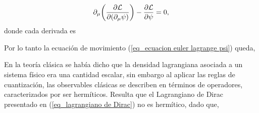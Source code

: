 \begin{equation}
	\partial_\mu \qty( \pdv{\mathcal{L}}{\qty( \partial_\mu \psi )} ) - \pdv{\mathcal{L}}{\psi} = 0,
	\label{eq_ecuacion euler lagrange psi}
\end{equation}
donde cada derivada es

Por lo tanto la ecuación de movimiento (\ref{eq_ecuacion euler lagrange psi}) queda,


En la teoría clásica se había dicho que la densidad lagrangiana asociada a un sistema físico era una cantidad escalar, sin embargo al aplicar las reglas de cuantización, las observables clásicas se describen en términos de operadores, caracterizados por ser hermíticos. Resulta que el Lagrangiano de Dirac presentado en (\ref{eq_lagrangiano de Dirac}) no es hermítico, dado que,


